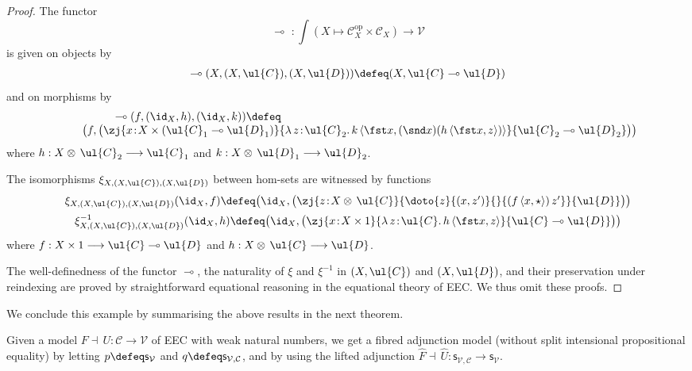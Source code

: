 \begin{proof}
The functor
\[
\multimap\,\, : \int (X \mapsto \mathcal{C}^{\text{op}}_X \times \mathcal{C}_X) \longrightarrow \mathcal{V} 
\]
is given on objects by
\[
\begin{array}{c}
\multimap (X, (X,\ul{C}), (X,\ul{D})) \defeq (X, \ul{C} \multimap \ul{D})
\end{array}
\]
and on morphisms by 
\[
\begin{array}{c}
\hspace{-9.5cm} \multimap (f, (\id_X, h), (\id_X, k)) \defeq 
\\
\hspace{0.75cm} \big(f, \big(\zj {x \!:\! X \times (\ul{C}_1 \multimap \ul{D}_1)} {\lambda\, z \!:\! \ul{C}_2 .\, k\, \langle \fst x , (\snd x)(h\, \langle \fst x , z \rangle) \rangle} {\ul{C}_2 \multimap \ul{D}_2}\big) \big)
\end{array}
\]
where $h : X \otimes\, \ul{C}_2 \longrightarrow \ul{C}_1$ and $k : X \otimes\, \ul{D}_1 \longrightarrow \ul{D}_2$. 

The isomorphisms $\xi_{X,(X,\ul{C}),(X,\ul{D})}$ between hom-sets are witnessed by functions
\[
\begin{array}{c}
\xi_{X,(X,\ul{C}),(X,\ul{D})}(\id_X, f) \defeq \big(\id_X, \big(\zj {z \!:\! X \otimes\, \ul{C}} {\doto {z} {(x,z')} {} {(f\, \langle x , \star \rangle)\, z'}} {\ul{D}}\big)\big)
\\[2mm]
\xi_{X,(X,\ul{C}),(X,\ul{D})}^{-1}(\id_X, h) \defeq \big(\id_X, \big(\zj {x \!:\! X \times 1} {\lambda\, z \!:\! \ul{C} .\, h\, \langle \fst x , z \rangle} {\ul{C} \multimap \ul{D}}\big) \big)
\end{array}
\]
where $f : X \times 1 \longrightarrow \ul{C} \multimap \ul{D}$ and $h : X \otimes\, \ul{C} \longrightarrow \ul{D}$.

The well-definedness of the functor $\multimap$, the naturality of $\xi$ and $\xi^{-1}$ in $(X,\ul{C})$ and $(X,\ul{D})$, and their preservation under reindexing are proved by straightforward equational reasoning in the equational theory of EEC\raisebox{0.75pt}{+}. We thus omit these proofs.
\end{proof}



We conclude this example by summarising the above results in the next theorem.   


\begin{theorem}
\label{thm:eecfibadjmodels}
Given a model $F \dashv\, U : \mathcal{C} \longrightarrow \mathcal{V}$ of EEC\raisebox{0.75pt}{+} with weak natural numbers, we get a fibred adjunction model (without split intensional propositional equality) by letting $p \defeq \mathsf{s}_{\mathcal{V}}$ and $q \defeq \mathsf{s}_{\mathcal{V},\mathcal{C}}$, and by using the lifted adjunction $\widehat{F} \dashv\, \widehat{U} : \mathsf{s}_{\mathcal{V},\mathcal{C}} \longrightarrow \mathsf{s}_{\mathcal{V}}$.
\end{theorem}

